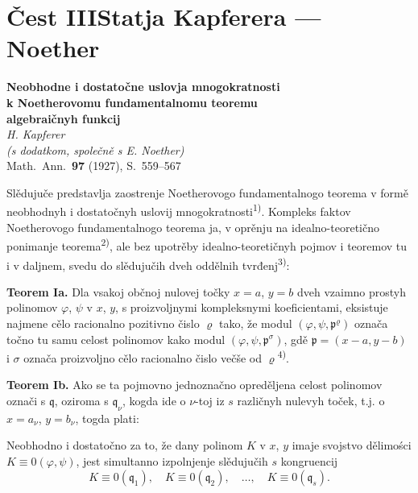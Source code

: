 \documentclass[11pt]{article}
\newcommand{\foreign}[1]{#1}
\theoremstyle{plain}
\begin{document}
\newpage
\part*{Čest III\hspace{1em}Statja Kapferera --- Noether}

\begin{center}
\Large\textbf{Neobhodne i dostatočne uslovja mnogokratnosti}\\[0.3em]
\Large\textbf{k Noetherovomu fundamentalnomu teoremu}\\[0.5em]
\large\textbf{algebraičnyh funkcij}\\[1em]
\normalsize\textit{H. Kapferer}\\[0.5em]
\small\textit{(s dodatkom, společně s E. Noether)}\\[1em]
\normalsize \foreign{Math.\ Ann.}\ \textbf{97} (1927), S.~559--567
\end{center}

\vspace{1em}

Slědujuče predstavlja zaostrenje Noetherovogo fundamentalnogo
teorema v formě neobhodnyh i dostatočnyh uslovij
mnogokratnosti\textsuperscript{1)}. Kompleks faktov Noetherovogo
fundamentalnogo teorema ja, v oprěnju na idealno-teoretično
ponimanje teorema\textsuperscript{2)}, ale bez upotrěby
idealno-teoretičnyh pojmov i teoremov tu i v daljnem, svedu do
slědujučih dveh oddělnih tvrđenj\textsuperscript{3)}:

\smallskip
\textbf{Teorem Ia.} Dla vsakoj občnoj nulovej točky $x = a$,
$y = b$ dveh vzaimno prostyh polinomov $\varphi$, $\psi$ v $x$, $y$,
s proizvoljnymi kompleksnymi koeficientami, eksistuje najmene cělo
racionalno pozitivno čislo $\varrho$ tako, že modul
$(\varphi, \psi, \mathfrak{p}^{\varrho})$ označa točno tu samu
celost polinomov kako modul $(\varphi, \psi, \mathfrak{p}^{\sigma})$,
gdě $\mathfrak{p} = (x-a, y-b)$ i $\sigma$ označa proizvoljno cělo
racionalno čislo večše od $\varrho$\textsuperscript{4)}.

\smallskip
\textbf{Teorem Ib.} Ako se ta pojmovno jednoznačno opreděljena
celost polinomov označi s $\mathfrak{q}$, oziroma s
$\mathfrak{q}_{\nu}$, kogda ide o $\nu$-toj iz $s$ različnyh nulevyh
toček, t.j. o $x = a_{\nu}$, $y = b_{\nu}$, togda plati:

Neobhodno i dostatočno za to, že dany polinom $K$ v $x$, $y$ imaje
svojstvo dělimości $K \equiv 0(\varphi, \psi)$, jest simultanno
izpolnjenje slědujučih $s$ kongruencij
\[
K \equiv 0(\mathfrak{q}_{1}), \quad K \equiv 0(\mathfrak{q}_{2}), \quad\ldots,\quad
K \equiv 0(\mathfrak{q}_{s}).
\]
\end{document}
